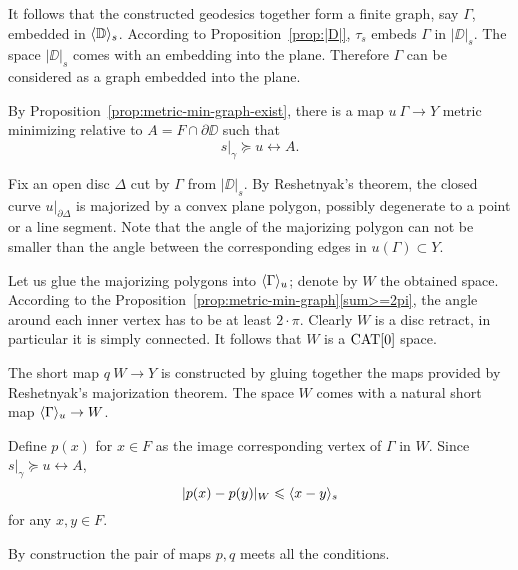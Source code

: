 
It follows that the constructed geodesics together form a finite graph, say $\Gamma$,
embedded in $\langle\mathbb{D}\rangle_s$.
According to Proposition~\ref{prop:|D|},
 $\tau_s$ embeds $\Gamma$ in $|\DD|_s$.
The space $|\DD|_s$ comes with an embedding into the plane.
Therefore $\Gamma$ can be considered as a graph embedded into the plane.

By Proposition~\ref{prop:metric-min-graph-exist}, there is a map $u\:\Gamma\to Y$ metric minimizing relative to $A=F\cap\partial\DD$ such that
\[s|_\gamma\succcurlyeq u\rel A.\]

Fix an open disc $\Delta$ cut by $\Gamma$ from $|\DD|_s$.
By Reshetnyak's theorem, the closed curve $u|_{\partial\Delta}$
is majorized by a convex plane polygon, possibly degenerate to a point or a line segment.
Note that the angle of the majorizing polygon can not be smaller than the angle between the corresponding edges in $u(\Gamma)\subset Y$.

Let us glue the majorizing polygons into $\langle\Gamma\rangle_u$;
denote by $W$ the obtained space.
According to the Proposition~\ref{prop:metric-min-graph}\ref{sum>=2pi}, the angle around each inner vertex has to be at least $2\cdot\pi$.
Clearly $W$ is a disc retract, in particular it is simply connected.
It follows that $W$ is a $\mathop{\rm CAT}\nolimits[0]$ space.

The short map $q\:W\to Y$ is constructed by gluing together the maps provided by Reshetnyak's majorization theorem.
The space $W$ comes with a natural short map $\langle\Gamma\rangle_u\to W$.

Define $p(x)$ for $x\in F$ as the image corresponding vertex of $\Gamma$ in $W$.
Since $s|_\gamma\succcurlyeq u\rel A$, 
\[|p(x)-p(y)|_W\leqslant \langle x-y\rangle_s\]
for any $x,y\in F$.

By construction the pair of maps $p,q$ meets all the conditions.
\qeds